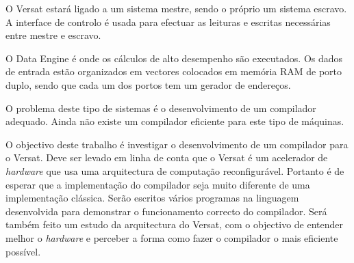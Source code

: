 O Versat estará ligado a um sistema mestre, sendo o próprio um sistema escravo. A interface de controlo é usada para efectuar as leituras e escritas necessárias entre mestre e escravo.

O Data Engine é onde os cálculos de alto desempenho são executados. Os dados de entrada estão organizados em vectores colocados em memória RAM de porto duplo, sendo que cada um dos portos tem um gerador de endereços.

O problema deste tipo de sistemas é o desenvolvimento de um compilador adequado. 
Ainda não existe um compilador eficiente para este tipo de máquinas.









O objectivo deste trabalho é investigar o desenvolvimento de um compilador para o Versat. Deve ser levado em linha de conta que o Versat é um acelerador de {\it hardware} que usa uma arquitectura de computação reconfigurável.
Portanto é de esperar que a implementação do compilador seja muito diferente de uma implementação clássica. Serão escritos vários programas na linguagem desenvolvida para demonstrar o funcionamento correcto do compilador. Será também feito um estudo da arquitectura do Versat, com o objectivo de entender melhor o {\it hardware} e perceber a forma como fazer
o compilador o mais eficiente possível.

